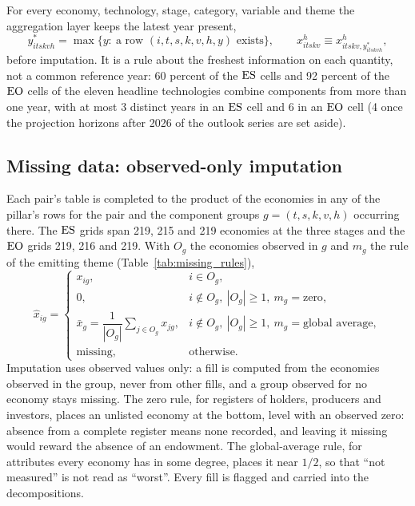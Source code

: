 For every economy, technology, stage, category, variable and theme the aggregation layer keeps the
latest year present,
\begin{equation}\label{eq:latest_year}
  y^{*}_{itskvh}=\max\{y:\ \text{a row }(i,t,s,k,v,h,y)\text{ exists}\},\qquad
  x^{h}_{itskv}\equiv x^{h}_{itskv,y^{*}_{itskvh}} ,
\end{equation}
before imputation. It is a rule about the freshest information on each quantity, not a common
reference year: 60 percent of the $\mathrm{ES}$ cells and 92 percent of the $\mathrm{EO}$ cells of the eleven
headline technologies combine components from more than one year, with at most 3 distinct years in
an $\mathrm{ES}$ cell and 6 in an $\mathrm{EO}$ cell (4 once the projection horizons after 2026 of the outlook
series are set aside).

\subsection{Missing data: observed-only imputation}\label{subsec:norm_missing}

Each pair's table is completed to the product of the economies in any of the pillar's rows for
the pair and the component groups $g=(t,s,k,v,h)$ occurring there. The $\mathrm{ES}$ grids span 219, 215
and 219 economies at the three stages and the $\mathrm{EO}$ grids 219, 216 and 219. With $O_g$ the
economies observed in $g$ and $m_g$ the rule of the emitting theme (Table~\ref{tab:missing_rules}),
\begin{equation}\label{eq:impute}
  \hat x_{ig}=\begin{cases}
    x_{ig}, & i\in O_g,\\[2pt]
    0, & i\notin O_g,\ |O_g|\ge 1,\ m_g=\text{zero},\\[2pt]
    \bar x_{g}=\dfrac{1}{|O_g|}\displaystyle\sum_{j\in O_g}x_{jg},
      & i\notin O_g,\ |O_g|\ge 1,\ m_g=\text{global average},\\[8pt]
    \text{missing}, & \text{otherwise}.
  \end{cases}
\end{equation}
Imputation uses observed values only: a fill is computed from the economies observed in the group,
never from other fills, and a group observed for no economy stays missing. The zero rule, for
registers of holders, producers and investors, places an unlisted economy at the bottom, level
with an observed zero: absence from a complete register means none recorded, and leaving it
missing would reward the absence of an endowment. The global-average rule, for attributes every
economy has in some degree, places it near $1/2$, so that ``not measured'' is not read as
``worst''. Every fill is flagged and carried into the decompositions.

